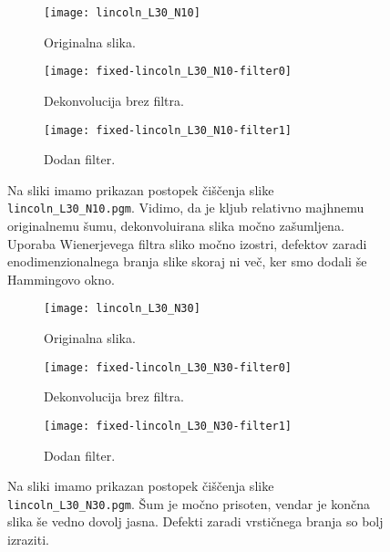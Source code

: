 \documentclass[a4 paper, 12pt]{article}
\begin{document}
\begin{figure}[H]\centering
	\begin{subfigure}[b]{0.3\textwidth}
		\texttt{[image: lincoln\_L30\_N10]}
		\caption{Originalna slika.}
		\label{sl21}
	\end{subfigure}
	\begin{subfigure}[b]{0.3\textwidth}
		\texttt{[image: fixed-lincoln\_L30\_N10-filter0]}
		\caption{Dekonvolucija brez filtra.}
		\label{sl22}
	\end{subfigure}
	\begin{subfigure}[b]{0.3\textwidth}
		\texttt{[image: fixed-lincoln\_L30\_N10-filter1]}
		\caption{Dodan filter.}
		\label{sl23}
	\end{subfigure}
	\caption{Na sliki imamo prikazan postopek \v ci\v s\v cenja slike {\tt lincoln\_L30\_N10.pgm}. Vidimo, da je kljub
		relativno majhnemu originalnemu \v sumu, dekonvoluirana slika mo\v cno za\v sumljena. Uporaba Wienerjevega
		filtra sliko mo\v cno izostri, defektov zaradi enodimenzionalnega branja slike skoraj ni ve\v c, ker smo
		dodali \v se Hammingovo okno.}
	\label{Sl2}
\end{figure}

\begin{figure}[H]\centering
	\begin{subfigure}[b]{0.3\textwidth}
		\texttt{[image: lincoln\_L30\_N30]}
		\caption{Originalna slika.}
		\label{sl31}
	\end{subfigure}
	\begin{subfigure}[b]{0.3\textwidth}
		\texttt{[image: fixed-lincoln\_L30\_N30-filter0]}
		\caption{Dekonvolucija brez filtra.}
		\label{sl32}
	\end{subfigure}
	\begin{subfigure}[b]{0.3\textwidth}
		\texttt{[image: fixed-lincoln\_L30\_N30-filter1]}
		\caption{Dodan filter.}
		\label{sl33}
	\end{subfigure}
	\caption{Na sliki imamo prikazan postopek \v ci\v s\v cenja slike {\tt lincoln\_L30\_N30.pgm}. \v Sum je mo\v cno
		prisoten, vendar je kon\v cna slika \v se vedno dovolj jasna. Defekti zaradi vrsti\v cnega branja so bolj
		izraziti.}
	\label{Sl3}
\end{figure}
\end{document}
